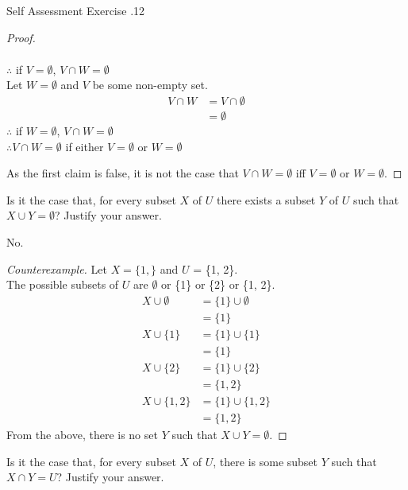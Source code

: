 \documentclass[\main/notes.tex]{subfiles}
\begin{document}
\begin{exercise}{Self Assessment Exercise \thechapter.12}
\begin{questions}
\begin{answer}
\begin{proof}
\begin{questions}[label=(\roman*), first=\bfseries]
\begin{answer}
\begin{subproof}[Subproof]
\begin{align*}
												\end{align*}
												$\therefore$ if $V = \emptyset$, $V \cap W = \emptyset$\\
												Let $W = \emptyset$ and $V$ be some non-empty set.
												\begin{align*}
													V \cap W &= V \cap \emptyset\\
													&= \emptyset
												\end{align*}
												$\therefore$ if $W = \emptyset$, $V \cap W = \emptyset$\\
												$\therefore V \cap W = \emptyset$ if either $V = \emptyset$ or $W = \emptyset$
											\end{subproof}
										\end{answer}
								\end{questions}
								As the first claim is false, it is not the case that $V \cap W = \emptyset$ iff $V = \emptyset$ or $W = \emptyset$.
							\end{proof}
						\end{answer}
					\pagebreak
					\item Is it the case that, for every subset $X$ of $U$ there exists a subset $Y$ of $U$ such that $X \cup Y = \emptyset$? Justify your answer.\\
						\begin{answer}
							No.
							\begin{proof}[Counterexample]
								Let $X = \{1,\}$ and $U$ = \{1, 2\}.\\
								The possible subsets of $U$ are $\emptyset$ or \{1\} or \{2\} or \{1, 2\}.
								\begin{align*}
									X \cup \emptyset &= \{1\} \cup \emptyset\\
									&= \{1\}\\
									X \cup \{1\} &= \{1\} \cup \{1\}\\
									&= \{1\}\\
									X \cup \{2\} &= \{1\} \cup \{2\}\\
									&= \{1, 2\}\\
									X \cup \{1, 2\} &= \{1\} \cup \{1, 2\}\\
									&= \{1, 2\}
								\end{align*}
								From the above, there is no set $Y$ such that $X \cup Y = \emptyset$.
							\end{proof}
						\end{answer}
					\item Is it the case that, for every subset $X$ of $U$, there is some subset $Y$ such that $X \cap Y = U$? Justify your answer.\\

\end{questions}
\end{exercise}
\end{document}

